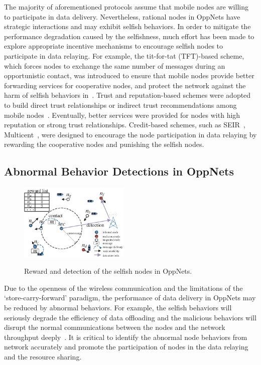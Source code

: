 The majority of aforementioned protocols
assume that mobile nodes are willing
to participate in data delivery.
Nevertheless,
rational nodes in OppNets have strategic interactions
and may exhibit selfish behaviors.
In order to mitigate the performance degradation
caused by the selfishness,
much effort has been made to explore
appropriate incentive mechanisms
to encourage selfish nodes to
participate in data relaying.
For example, the tit-for-tat (TFT)-based scheme,
which forces nodes to exchange the same number
of messages during an opportunistic contact,
was introduced to ensure that
mobile nodes provide better forwarding services
for cooperative nodes,
and protect the network against the harm of selfish behaviors
in~\cite{DBLP:journals/tmc/MastronardePXLS16,
DBLP:journals/twc/HsuD17}.
Trust and reputation-based
schemes were adopted to build direct trust relationships
or indirect trust recommendations
among mobile
nodes~\cite{DBLP:journals/tvt/ChenLWW16,DBLP:conf/mdm/JethawaM18}.
Eventually, better services were provided
for nodes with high reputation
or strong trust relationships.
Credit-based schemes, such as SEIR~\cite{DBLP:conf/ciss/ChhabraVS17},
Multicent~\cite{DBLP:journals/tpds/ChenSY15},
were designed to encourage the node participation
in data relaying
by rewarding the cooperative nodes
and punishing the selfish nodes.

\subsection{Abnormal Behavior Detections in OppNets}
\begin{figure}
  \centering
  {\includegraphics[width=0.47\textwidth]{fig/sketch.eps}}
     \caption{Reward and detection of the selfish nodes in OppNets.}
     \label{fig:sketch}
\end{figure}
Due to the openness of
the wireless communication and the limitations of the
`store-carry-forward' paradigm,
the performance of data delivery in OppNets may be reduced
by abnormal behaviors.
For example,
the selfish behaviors will seriously degrade
the efficiency of data offloading
and the malicious behaviors
will disrupt the normal communications
between the nodes and the network
throughput deeply~\cite{DBLP:journals/comsur/JedariXN18}.
It is critical to
identify the abnormal node behaviors from network accurately
and promote the participation of nodes
in the data relaying and the resource sharing.

